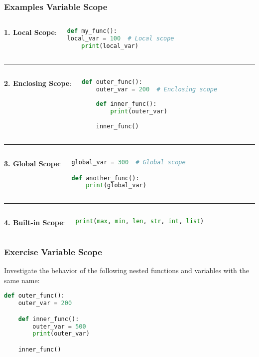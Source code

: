 {\nologo
\begin{frame}[fragile]
  \frametitle{Examples Variable Scope}
  \begin{columns}[T]
      \textbf{1. Local Scope}:
      \begin{lstlisting}[language=Python]
def my_func():
local_var = 100  # Local scope
    print(local_var)
      \end{lstlisting}
  \end{columns}
  {\color{scharlaken}\noindent\rule{\textwidth}{0.4pt}}
  \begin{columns}    
    \textbf{2. Enclosing Scope}:
    \begin{lstlisting}[language=Python]
def outer_func():
    outer_var = 200  # Enclosing scope
          
    def inner_func():
        print(outer_var)
    
    inner_func()
    \end{lstlisting}
  \end{columns}
  {\color{scharlaken}\noindent\rule{\textwidth}{0.4pt}}
  \begin{columns}[T]
    \textbf{3. Global Scope}:
      \begin{lstlisting}[language=Python]
global_var = 300  # Global scope

def another_func():
    print(global_var)
      \end{lstlisting}
    \end{columns}
    {\color{scharlaken}\noindent\rule{\textwidth}{0.4pt}}
    \begin{columns}[T]
        \textbf{4. Built-in Scope}:
        \begin{lstlisting}[language=Python]
print(max, min, len, str, int, list)
        \end{lstlisting}
    \end{columns}
\end{frame}
}

\begin{frame}[fragile]
  \frametitle{Exercise Variable Scope}
  Investigate the behavior of the following nested functions and variables with the same name:
  \begin{lstlisting}[language=Python]
def outer_func():
    outer_var = 200

    def inner_func():
        outer_var = 500
        print(outer_var)

    inner_func()
  \end{lstlisting}
\end{frame}

